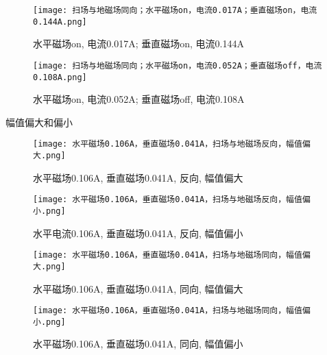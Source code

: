 \begin{figure}[H]
    \centering
    \begin{minipage}{0.45\textwidth}
        \texttt{[image: 扫场与地磁场同向；水平磁场on，电流0.017A；垂直磁场on，电流0.144A.png]}
        \caption{水平磁场on, 电流0.017A; 垂直磁场on, 电流0.144A}
        \label{fig:img7}
    \end{minipage}%
       \hfill
    \begin{minipage}{0.45\textwidth}
        \texttt{[image: 扫场与地磁场同向；水平磁场on，电流0.052A；垂直磁场off，电流0.108A.png]}
        \caption{水平磁场on, 电流0.052A; 垂直磁场off, 电流0.108A}
        \label{fig:img8}
    \end{minipage}
\end{figure}

幅值偏大和偏小

\begin{figure}[H]
    \centering
    \begin{minipage}{0.45\textwidth}
        \texttt{[image: 水平磁场0.106A，垂直磁场0.041A，扫场与地磁场反向，幅值偏大.png]}
        \caption{水平磁场0.106A, 垂直磁场0.041A, 反向, 幅值偏大}
        \label{fig:img9}
    \end{minipage}%
       \hfill
    \begin{minipage}{0.45\textwidth}
        \texttt{[image: 水平磁场0.106A，垂直磁场0.041A，扫场与地磁场反向，幅值偏小.png]}
        \caption{水平电流0.106A, 垂直磁场0.041A, 反向, 幅值偏小}
        \label{fig:img10}
    \end{minipage}
\end{figure}

\begin{figure}[H]
    \centering
    \begin{minipage}{0.45\textwidth}
        \texttt{[image: 水平磁场0.106A，垂直磁场0.041A，扫场与地磁场同向，幅值偏大.png]}
        \caption{水平磁场0.106A, 垂直磁场0.041A, 同向, 幅值偏大}
        \label{fig:img11}
    \end{minipage}%
       \hfill
    \begin{minipage}{0.45\textwidth}
        \texttt{[image: 水平磁场0.106A，垂直磁场0.041A，扫场与地磁场同向，幅值偏小.png]}
        \caption{水平磁场0.106A, 垂直磁场0.041A, 同向, 幅值偏小}
        \label{fig:img12}
    \end{minipage}
\end{figure}



